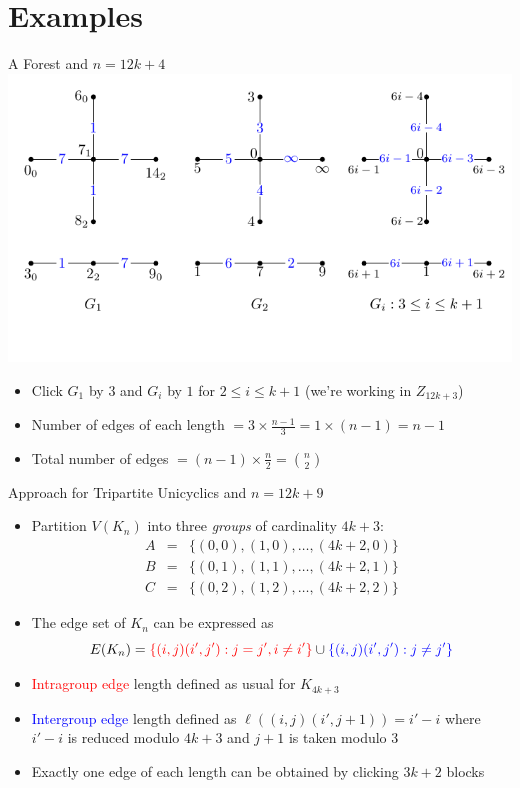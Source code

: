 \documentclass[11pt,serif,professionalfont,aspectratio=169]{beamer}
\theoremstyle{plain}
\begin{document}
\section{Examples}
\begin{frame}{A Forest and $n=12k+4$}
    \centering
    \includegraphics[scale=0.8]{Forest 4 mod 12.pdf}
    \pause 
    \begin{itemize}
        \item Click $G_1$ by $3$ and $G_i$ by $1$ for $2\leq i \leq k+1$ (we're working in $Z_{12k+3}$)
        \item Number of edges of each length $=3\times \frac{n-1}{3}=1\times (n-1)=n-1$
        \item Total number of edges $=(n-1)\times \frac{n}{2} =\binom{n}{2} $
    \end{itemize}
\end{frame}
\begin{frame}{Approach for Tripartite Unicyclics and $n=12k+9$}
  \begin{itemize}
      \item Partition $V(K_n)$ into three \emph{groups} of cardinality $4k+3:$
      \[
\begin{array}{lll}
A&=&\{(0,0),(1,0),\dots,(4k+2,0)\}\\
B&=&\{(0,1),(1,1),\dots,(4k+2,1)\}\\
C&=&\{(0,2),(1,2),\dots,(4k+2,2)\}
\end{array}
\]
\item The edge set of $K_n$ can be expressed as
\[
  E(K_n) = \textcolor{red}{ \{(i,j)(i',j') : j=j', i\neq i'\}}    
    \cup \textcolor{blue}{\{(i,j)(i',j') : j\neq j'\}}
\]
\item \textcolor{red}{Intragroup edge} length defined as usual for $K_{4k+3}$
\item \textcolor{blue}{Intergroup edge} length defined as $\ell((i,j)(i',j+1))=i'-i$ where $i'-i$ is reduced modulo $4k+3$ and $j+1$ is taken modulo 3
\item Exactly one edge of each length can be obtained by clicking $3k+2$ blocks
  \end{itemize}
\end{frame}
\end{document}
